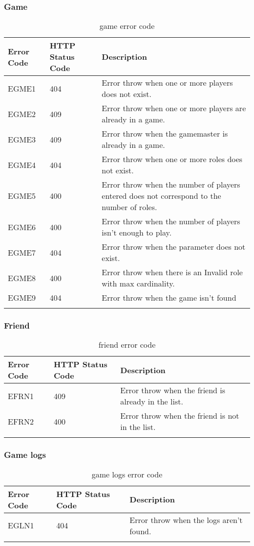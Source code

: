 \subsubsection{Game}
\begin{longtable}{|p{}|p{} |p{}|} 
    \hline
    \textbf{Error Code} & \textbf{HTTP Status Code} & \textbf{Description} \\\hline
    EGME1 & 404 & Error throw when one or more players does not exist.\\\hline
    EGME2 & 409 & Error throw when one or more players are already in a game.\\\hline
    EGME3 & 409 & Error throw when the gamemaster is already in a game.\\\hline
    EGME4 & 404 & Error throw when one or more roles does not exist.\\\hline
    EGME5 & 400 & Error throw when the number of players entered does not correspond to the number of roles.\\\hline
    EGME6 & 400 & Error throw when the number of players isn't enough to play.\\\hline
    EGME7 & 404 & Error throw when the parameter does not exist.\\\hline
    EGME8 & 400 & Error throw when there is an Invalid role with max cardinality.\\\hline
    EGME9 & 404 & Error throw when the game isn't found\\\hline
    \caption{game error code}
    \label{tab:game_error_code}
\end{longtable}
\subsubsection{Friend}
\begin{longtable}{|p{}|p{} |p{}|} 
    \hline
    \textbf{Error Code} & \textbf{HTTP Status Code} & \textbf{Description} \\\hline
    EFRN1 & 409 & Error throw when the friend is already in the list.\\\hline
    EFRN2 & 400 & Error throw when the friend is not in the list.\\\hline
    \caption{friend error code}
    \label{tab:friend_error_code}
\end{longtable}
\subsubsection{Game logs}
\begin{longtable}{|p{}|p{} |p{}|} 
    \hline
    \textbf{Error Code} & \textbf{HTTP Status Code} & \textbf{Description} \\\hline
    EGLN1 & 404 & Error throw when the logs aren't found.\\\hline
    \caption{game logs error code}
    \label{tab:game_logs_error_code}
\end{longtable}

